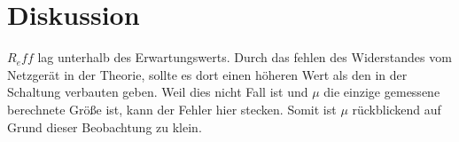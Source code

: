 \section{Diskussion}
\label{sec:Diskussion}
$R_eff$ lag unterhalb des Erwartungswerts. 
Durch das fehlen des Widerstandes vom Netzgerät in der Theorie, sollte es dort einen höheren Wert als den in der Schaltung verbauten geben.
Weil dies nicht Fall ist und $\mu$ die einzige gemessene berechnete Größe ist, kann der Fehler hier stecken.
Somit ist $\mu$ rückblickend auf Grund dieser Beobachtung zu klein.